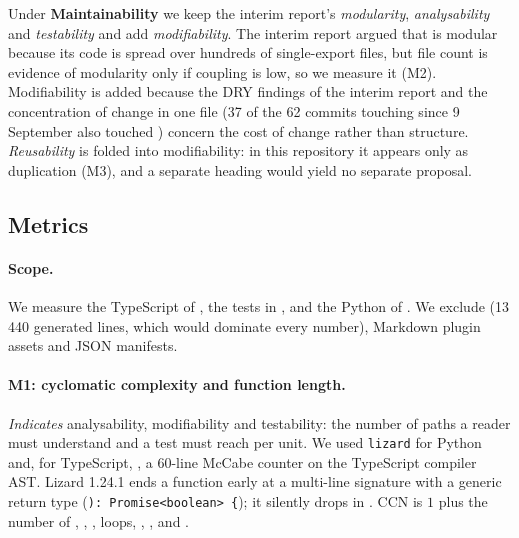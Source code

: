 Under \textbf{Maintainability} we keep the interim report's \emph{modularity}, \emph{analysability} and \emph{testability}
and add \emph{modifiability}. The interim report argued that  is modular because its code is spread
over hundreds of single-export files, but file count is evidence of modularity only if coupling is low, so we measure
it (M2). Modifiability is added because the DRY findings of the interim report and the concentration of change in one
file (37 of the 62 commits touching  since 9 September also touched ) concern
the cost of change rather than structure. \emph{Reusability} is folded into modifiability: in this repository it appears
only as duplication (M3), and a separate heading would yield no separate proposal.

\subsection{Metrics}
\label{sec:quality:metrics}

\paragraph{Scope.} We measure the TypeScript of , the tests in
,  and the Python of . We exclude 
(13\,440 generated lines, which would dominate every number), Markdown plugin assets and JSON manifests.


\paragraph{M1: cyclomatic complexity and function length.}
\emph{Indicates} analysability, modifiability and testability: the number of paths a reader must understand and a test
must reach per unit. We used \texttt{lizard} for Python and, for TypeScript, , a 60-line
McCabe counter on the TypeScript compiler AST. Lizard 1.24.1 ends a function early at a multi-line signature with a
generic return type (\texttt{): Promise<boolean> \{}); it silently drops  in . CCN is
$1$ plus the number of , , , loops, , \code{&&}, \code{||} and .

